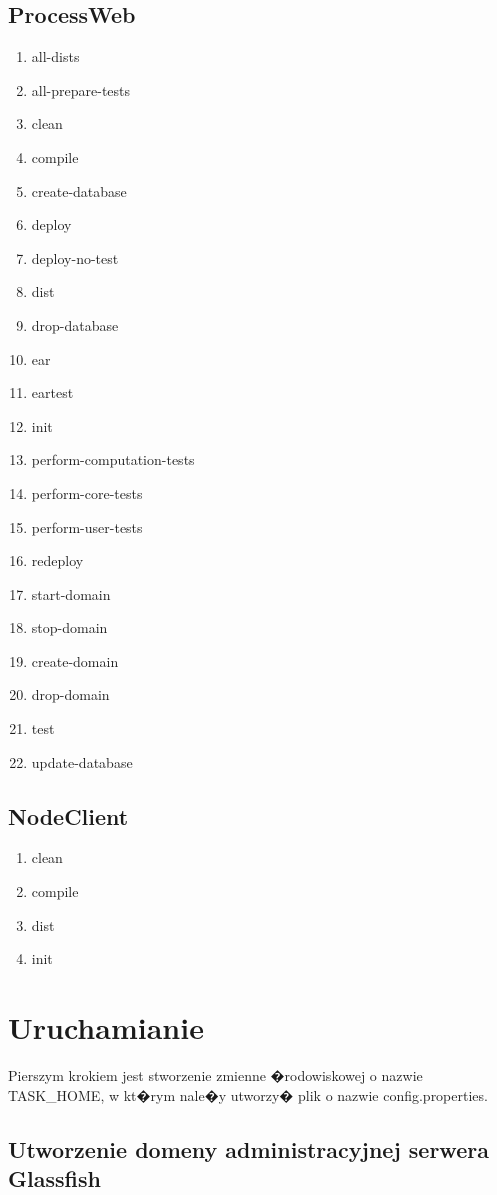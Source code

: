 \documentclass{article}
\begin{document}
\subsection{ProcessWeb}
{\small
\begin{enumerate}
  \item all-dists
  \item all-prepare-tests
  \item clean
  \item compile
  \item create-database
  \item deploy
  \item deploy-no-test
  \item dist
  \item drop-database
  \item ear
  \item eartest
  \item init
  \item perform-computation-tests
  \item perform-core-tests
  \item perform-user-tests
  \item redeploy
  \item start-domain
  \item stop-domain
  \item create-domain
  \item drop-domain
  \item test
  \item update-database
\end{enumerate}
}
\subsection{NodeClient}

{\small
\begin{enumerate}
  \item clean
  \item compile
  \item dist
  \item init
\end{enumerate}
}
\section{Uruchamianie}

Pierszym krokiem jest stworzenie zmienne �rodowiskowej o nazwie TASK\_HOME, w kt�rym nale�y utworzy� plik o nazwie config.properties.

\subsection{Utworzenie domeny administracyjnej serwera Glassfish}
\end{document}
